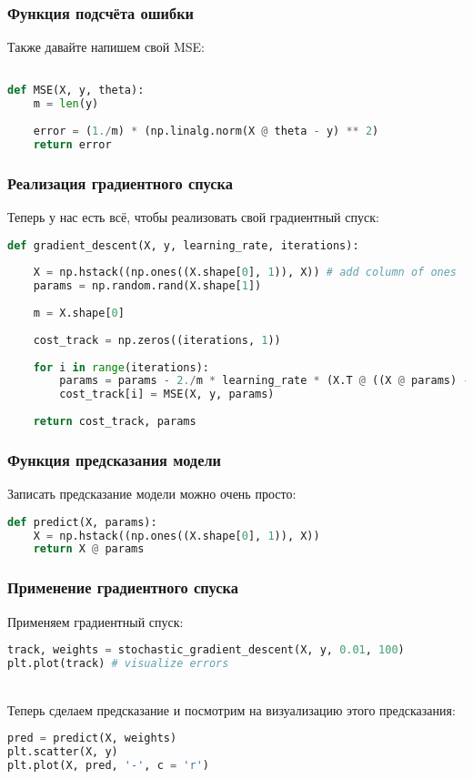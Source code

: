 \documentclass{article}
\theoremstyle{problemstyle}
\theoremstyle{ans}
\begin{document}
\subsubsection{Функция подсчёта ошибки}
Также давайте напишем свой MSE:
\begin{lstlisting}[language=python]

def MSE(X, y, theta):
    m = len(y)
    
    error = (1./m) * (np.linalg.norm(X @ theta - y) ** 2)
    return error
\end{lstlisting}

\subsubsection{Реализация градиентного спуска}
Теперь у нас есть всё, чтобы реализовать свой градиентный спуск:\\
\begin{lstlisting}[language=python]
def gradient_descent(X, y, learning_rate, iterations):
    
    X = np.hstack((np.ones((X.shape[0], 1)), X)) # add column of ones
    params = np.random.rand(X.shape[1])
    
    m = X.shape[0]
    
    cost_track = np.zeros((iterations, 1))
    
    for i in range(iterations):
        params = params - 2./m * learning_rate * (X.T @ ((X @ params) - y))
        cost_track[i] = MSE(X, y, params)
        
    return cost_track, params
\end{lstlisting}

\subsubsection{Функция предсказания модели}
Записать предсказание модели можно очень просто:\\
\begin{lstlisting}[language=python]
def predict(X, params):
    X = np.hstack((np.ones((X.shape[0], 1)), X))
    return X @ params
\end{lstlisting}

\subsubsection{Применение градиентного спуска}
Применяем градиентный спуск:\\
\begin{lstlisting}[language=python]
track, weights = stochastic_gradient_descent(X, y, 0.01, 100)
plt.plot(track) # visualize errors
\end{lstlisting}
\\
Теперь сделаем предсказание и посмотрим на визуализацию этого предсказания:\\
\begin{lstlisting}[language=python]
pred = predict(X, weights)
plt.scatter(X, y)
plt.plot(X, pred, '-', c = 'r')
\end{lstlisting}
\end{document}
